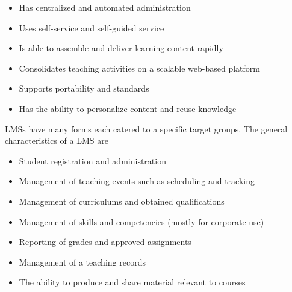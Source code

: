 \begin{itemize}
	\item Has centralized and automated administration
	\item Uses self-service and self-guided service
	\item Is able to assemble and deliver learning content rapidly
	\item Consolidates teaching activities on a scalable web-based platform
	\item Supports portability and standards
	\item Has the ability to personalize content and reuse knowledge
\end{itemize}

LMSs have many forms each catered to a specific target groups. 
The general characteristics of a LMS are~\citep{Kerschenbaum}

\begin{itemize}
	\item Student registration and administration
	\item Management of teaching events such as scheduling and tracking
	\item Management of curriculums and obtained qualifications
	\item Management of skills and competencies (mostly for corporate use)
	\item Reporting of grades and approved assignments
	\item Management of	a teaching records
	\item The ability to produce and share material relevant to courses

\end{itemize}

